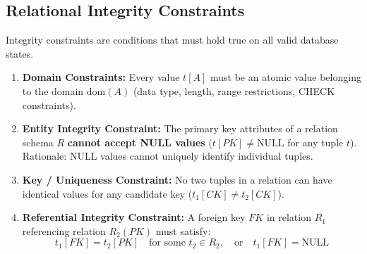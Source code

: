 \documentclass[11pt,a4paper]{article}
\newcommand{\ic}[1]{\mbox{\colorbox{AnthCodeBG}{\footnotesize\ttfamily\textcolor{AnthBlue}{#1}}}}
\begin{document}
\begin{center}
\end{center}

\subsection{Relational Integrity Constraints}

Integrity constraints are conditions that must hold true on all valid database states.

\begin{enumerate}
  \item \textbf{Domain Constraints:} Every value $t[A]$ must be an atomic value belonging to the domain $\text{dom}(A)$ (data type, length, range restrictions, \ic{CHECK} constraints).
  \item \textbf{Entity Integrity Constraint:} The primary key attributes of a relation schema $R$ \textbf{cannot accept NULL values} ($t[PK] \neq \text{NULL}$ for any tuple $t$). Rationale: NULL values cannot uniquely identify individual tuples.
  \item \textbf{Key / Uniqueness Constraint:} No two tuples in a relation can have identical values for any candidate key ($t_1[CK] \neq t_2[CK]$).
  \item \textbf{Referential Integrity Constraint:} A foreign key $FK$ in relation $R_1$ referencing relation $R_2(PK)$ must satisfy:
    \begin{equation}
      t_1[FK] = t_2[PK] \quad \text{for some } t_2 \in R_2, \quad \text{or} \quad t_1[FK] = \text{NULL}
    \end{equation}
\end{enumerate}
\end{document}
